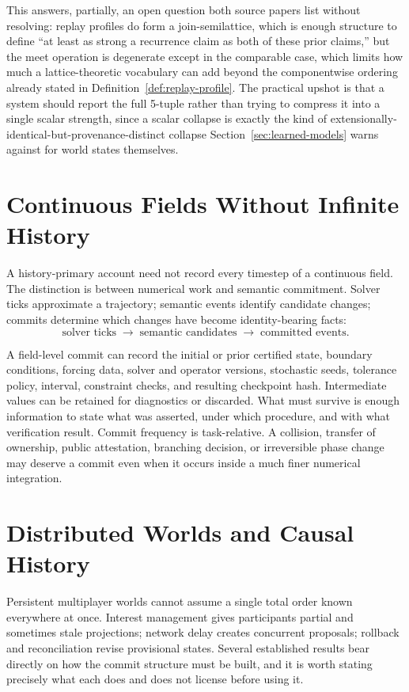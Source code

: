 \documentclass[11pt]{article}
\begin{document}
This answers, partially, an open question both source papers list without resolving: replay profiles do form a join-semilattice, which is enough structure to define ``at least as strong a recurrence claim as both of these prior claims,'' but the meet operation is degenerate except in the comparable case, which limits how much a lattice-theoretic vocabulary can add beyond the componentwise ordering already stated in Definition~\ref{def:replay-profile}. The practical upshot is that a system should report the full 5-tuple rather than trying to compress it into a single scalar strength, since a scalar collapse is exactly the kind of extensionally-identical-but-provenance-distinct collapse Section~\ref{sec:learned-models} warns against for world states themselves.

\section{Continuous Fields Without Infinite History}
\label{sec:continuous}

A history-primary account need not record every timestep of a continuous field. The distinction is between numerical work and semantic commitment. Solver ticks approximate a trajectory; semantic events identify candidate changes; commits determine which changes have become identity-bearing facts:
\[
\text{solver ticks} \;\to\; \text{semantic candidates} \;\to\; \text{committed events}.
\]

A field-level commit can record the initial or prior certified state, boundary conditions, forcing data, solver and operator versions, stochastic seeds, tolerance policy, interval, constraint checks, and resulting checkpoint hash. Intermediate values can be retained for diagnostics or discarded. What must survive is enough information to state what was asserted, under which procedure, and with what verification result. Commit frequency is task-relative. A collision, transfer of ownership, public attestation, branching decision, or irreversible phase change may deserve a commit even when it occurs inside a much finer numerical integration.

\section{Distributed Worlds and Causal History}
\label{sec:distributed}

Persistent multiplayer worlds cannot assume a single total order known everywhere at once. Interest management gives participants partial and sometimes stale projections; network delay creates concurrent proposals; rollback and reconciliation revise provisional states. Several established results bear directly on how the commit structure must be built, and it is worth stating precisely what each does and does not license before using it.
\end{document}
